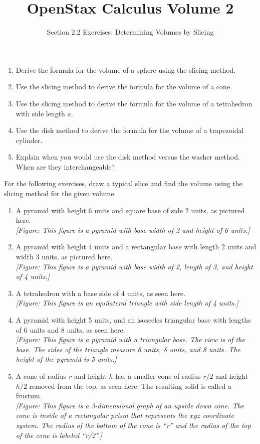 \documentclass{exercises}
\title{OpenStax Calculus Volume 2}
\subtitle{Section 2.2 Exercises: Determining Volumes by Slicing}
\author{}
\date{}
\begin{document}
\maketitle

\begin{enumerate}[start=1]
\item Derive the formula for the volume of a sphere using the slicing method.
\item Use the slicing method to derive the formula for the volume of a cone.
\item Use the slicing method to derive the formula for the volume of a tetrahedron with side length $a$.
\item Use the disk method to derive the formula for the volume of a trapezoidal cylinder.
\item Explain when you would use the disk method versus the washer method. When are they interchangeable?
\end{enumerate}

For the following exercises, draw a typical slice and find the volume using the slicing method for the given volume.

\begin{enumerate}[resume]
\item A pyramid with height 6 units and square base of side 2 units, as pictured here. \\ \textit{[Figure: This figure is a pyramid with base width of 2 and height of 6 units.]}
\item A pyramid with height 4 units and a rectangular base with length 2 units and width 3 units, as pictured here. \\ \textit{[Figure: This figure is a pyramid with base width of 2, length of 3, and height of 4 units.]}
\item A tetrahedron with a base side of 4 units, as seen here. \\ \textit{[Figure: This figure is an equilateral triangle with side length of 4 units.]}
\item A pyramid with height 5 units, and an isosceles triangular base with lengths of 6 units and 8 units, as seen here. \\ \textit{[Figure: This figure is a pyramid with a triangular base. The view is of the base. The sides of the triangle measure 6 units, 8 units, and 8 units. The height of the pyramid is 5 units.]}
\item A cone of radius $r$ and height $h$ has a smaller cone of radius $r/2$ and height $h/2$ removed from the top, as seen here. The resulting solid is called a frustum. \\ \textit{[Figure: This figure is a 3-dimensional graph of an upside down cone. The cone is inside of a rectangular prism that represents the $xyz$ coordinate system. The radius of the bottom of the cone is ``r'' and the radius of the top of the cone is labeled ``r/2''.]}
\end{enumerate}
\end{document}
